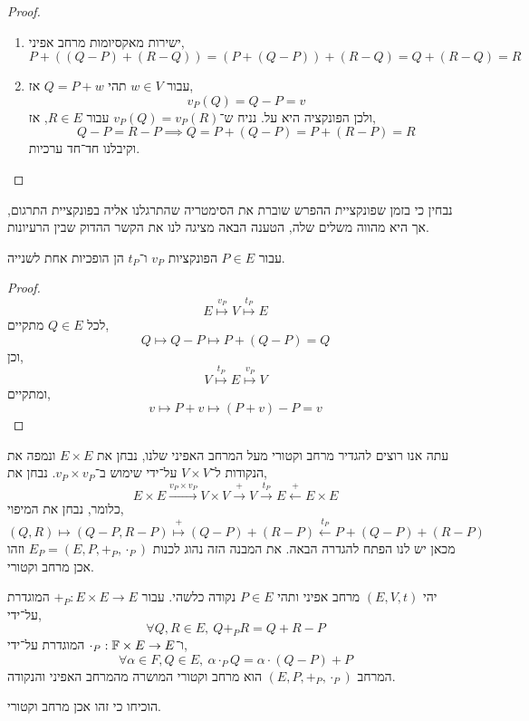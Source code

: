\begin{proof}
	\begin{enumerate}
		\item ישירות מאקסיומות מרחב אפיני,
		\[
			P + ((Q - P) + (R - Q))
			= (P + (Q - P)) + (R - Q)
			= Q + (R - Q)
			= R
		\]
		\item עבור $w \in V$ תהי $Q = P + w$ אז,
			\[
				v_P(Q)
				= Q - P
				= v
			\]
			ולכן הפונקציה היא על.
			נניח ש־$v_P(Q) = v_P(R)$ עבור $R \in E$, אז,
			\[
				Q - P
				= R - P
				\implies Q = P + (Q - P)
				= P + (R - P)
				= R
			\]
			וקיבלנו חד־חד ערכיות.
			\qedhere
	\end{enumerate}
\end{proof}
נבחין כי בזמן שפונקציית ההפרש שוברת את הסימטריה שהתרגלנו אליה בפונקציית התרגום, אך היא מהווה משלים שלה, הטענה הבאה מציגה לנו את הקשר ההדוק שבין הרעיונות.
\begin{proposition}
	עבור $P \in E$ הפונקציות $v_P$ ו־$t_P$ הן הופכיות אחת לשנייה.
\end{proposition}
\begin{proof}
	\[
		E \overset{v_P}{\mapsto} V
		\overset{t_P}{\mapsto} E
	\]
	לכל $Q \in E$ מתקיים,
	\[
		Q
		\mapsto Q - P
		\mapsto P + (Q - P)
		= Q
	\]
	וכן,
	\[
		V \overset{t_P}{\mapsto} E
		\overset{v_P}{\mapsto} V
	\]
	ומתקיים,
	\[
		v
		\mapsto P + v
		\mapsto (P + v) - P
		= v
	\]
\end{proof}
עתה אנו רוצים להגדיר מרחב וקטורי מעל המרחב האפיני שלנו, נבחן את $E \times E$ ונמפה את הנקודות ל־$V \times V$ על־ידי שימוש ב־$v_P \times v_P$.
נבחן את,
\[
	E \times E
	\xrightarrow{v_P \times v_P} V \times V
	\xrightarrow{+} V
	\xrightarrow{t_P} E
	\xleftarrow{+} E \times E
\]
כלומר, נבחן את המיפוי,
\[
	(Q, R)
	\mapsto (Q - P, R - P)
	\overset{+}{\mapsto}  (Q - P) + (R - P)
	\overset{t_P}{\leftarrow} P + (Q - P) + (R - P)
\]
מכאן יש לנו הפתח להגדרה הבאה.
את המבנה הזה נהוג לכנות $E_P = (E, P, +_P, \cdot_P)$ וזהו אכן מרחב וקטורי.
\begin{definition}
	יהי $(E, V, t)$ מרחב אפיני ותהי $P \in E$ נקודה כלשהי.
	עבור $+_P : E \times E \to E$ המוגדרת על־ידי,
	\[
		\forall Q, R \in E,\ Q +_P R = Q + R - P
	\]
	ו־$\cdot_P : \mathbb{F} \times E \to E$ המוגדרת על־ידי,
	\[
		\forall \alpha \in F, Q \in E,\ \alpha \cdot_P Q = \alpha \cdot (Q - P) + P
	\]
	המרחב $(E, P, +_P, \cdot_P)$ הוא מרחב וקטורי המושרה מהמרחב האפיני והנקודה.
\end{definition}
\begin{exercise}
	הוכיחו כי זהו אכן מרחב וקטורי.
\end{exercise}

